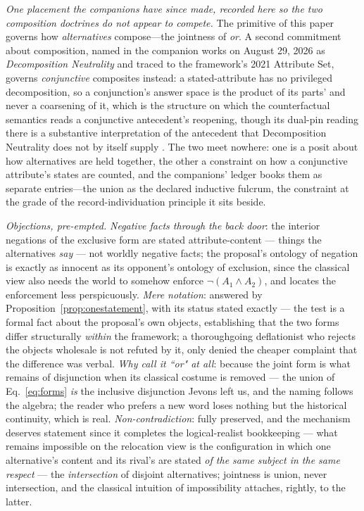 \documentclass[11pt]{article}
\begin{document}
\emph{One placement the companions have since made, recorded here so the two composition doctrines do not appear to compete.} The primitive of this paper governs how \emph{alternatives} compose---the jointness of \emph{or}. A second commitment about composition, named in the companion works on August 29, 2026 as \emph{Decomposition Neutrality} and traced to the framework's 2021 Attribute Set, governs \emph{conjunctive} composites instead: a stated-attribute has no privileged decomposition, so a conjunction's answer space is the product of its parts' and never a coarsening of it, which is the structure on which the counterfactual semantics reads a conjunctive antecedent's reopening, though its dual-pin reading there is a substantive interpretation of the antecedent that Decomposition Neutrality does not by itself supply \parencite{AethusBrief, Aethus}. The two meet nowhere: one is a posit about how alternatives are held together, the other a constraint on how a conjunctive attribute's states are counted, and the companions' ledger books them as separate entries---the union as the declared inductive fulcrum, the constraint at the grade of the record-individuation principle it sits beside.

\emph{Objections, pre-empted.} \emph{Negative facts through the back door}: the interior negations of the exclusive form are stated attribute-content --- things the alternatives \emph{say} --- not worldly negative facts; the proposal's ontology of negation is exactly as innocent as its opponent's ontology of exclusion, since the classical view also needs the world to somehow enforce $\neg(A_1 \wedge A_2)$, and locates the enforcement less perspicuously. \emph{Mere notation}: answered by Proposition~\ref{prop:onestatement}, with its status stated exactly --- the test is a formal fact about the proposal's own objects, establishing that the two forms differ structurally \emph{within} the framework; a thoroughgoing deflationist who rejects the objects wholesale is not refuted by it, only denied the cheaper complaint that the difference was verbal. \emph{Why call it ``or" at all}: because the joint form is what remains of disjunction when its classical costume is removed --- the union of Eq.~\eqref{eq:forms} \emph{is} the inclusive disjunction Jevons left us, and the naming follows the algebra; the reader who prefers a new word loses nothing but the historical continuity, which is real. \emph{Non-contradiction}: fully preserved, and the mechanism deserves statement since it completes the logical-realist bookkeeping --- what remains impossible on the relocation view is the configuration in which one alternative's content and its rival's are stated \emph{of the same subject in the same respect} --- the \emph{intersection} of disjoint alternatives; jointness is union, never intersection, and the classical intuition of impossibility attaches, rightly, to the latter.
\end{document}
